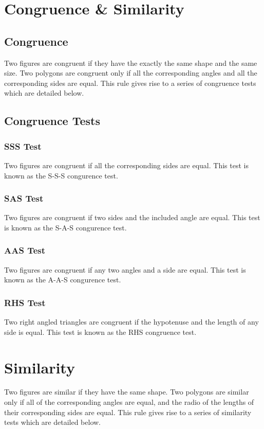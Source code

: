 \documentclass{report}
\begin{document}
\begin{flushleft}
\section{Congruence \& Similarity}
\subsection{Congruence}
Two figures are congruent if they have the exactly the same shape and the same size. Two polygons are congruent only if all the corresponding angles and all the corresponding sides are equal. This rule gives rise to a series of congruence tests which are detailed below.

\subsection{Congruence Tests}
\subsubsection{SSS Test}
Two figures are congruent if all the corresponding sides are equal. This test is known as the S-S-S congurence test.

\subsubsection{SAS Test}
Two figures are congruent if two sides and the included angle are equal. This test is known as the S-A-S congurence test.

\subsubsection{AAS Test}
Two figures are congruent if any two angles and a side are equal.  This test is known as the A-A-S congurence test.

\subsubsection{RHS Test}
Two right angled triangles are congruent if the hypotenuse and the length of any side is equal. This test is known as the RHS congruence test.

\section{Similarity}
Two figures are similar if they have the same shape. Two polygons are similar only if all of the corresponding angles are equal, and the radio of the lengths of their corresponding sides are equal. This rule gives rise to a series of similarity tests which are detailed below.


\end{flushleft}
\end{document}
